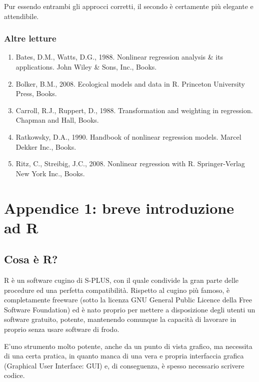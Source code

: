 \documentclass[a4paper,12pt,oneside]{book}
\providecommand{\tightlist}{%
  \setlength{\itemsep}{0pt}\setlength{\parskip}{0pt}}
\begin{document}
Pur essendo entrambi gli approcci corretti, il secondo è certamente più elegante e attendibile.

\hypertarget{altre-letture-5}{%
\subsection{Altre letture}\label{altre-letture-5}}

\begin{enumerate}
\def\labelenumi{\arabic{enumi}.}
\tightlist
\item
  Bates, D.M., Watts, D.G., 1988. Nonlinear regression analysis \& its applications. John Wiley \& Sons, Inc., Books.
\item
  Bolker, B.M., 2008. Ecological models and data in R. Princeton University Press, Books.
\item
  Carroll, R.J., Ruppert, D., 1988. Transformation and weighting in regression. Chapman and Hall, Books.
\item
  Ratkowsky, D.A., 1990. Handbook of nonlinear regression models. Marcel Dekker Inc., Books.
\item
  Ritz, C., Streibig, J.C., 2008. Nonlinear regression with R. Springer-Verlag New York Inc., Books.
\end{enumerate}

\hypertarget{appendice-1-breve-introduzione-ad-r}{%
\chapter{Appendice 1: breve introduzione ad R}\label{appendice-1-breve-introduzione-ad-r}}

\hypertarget{cosa-e-r}{%
\section*{Cosa è R?}\label{cosa-e-r}}

R è un software cugino di S-PLUS, con il quale condivide la gran parte delle procedure ed una perfetta compatibilità. Rispetto al cugino più famoso, è completamente freeware (sotto la licenza GNU General Public Licence della Free Software Foundation) ed è nato proprio per mettere a disposizione degli utenti un software gratuito, potente, mantenendo comunque la capacità di lavorare in proprio senza usare software di frodo.

E'uno strumento molto potente, anche da un punto di vista grafico, ma necessita di una certa pratica, in quanto manca di una vera e propria interfaccia grafica (Graphical User Interface: GUI) e, di conseguenza, è spesso necessario scrivere codice.
\end{document}
